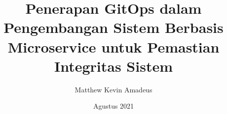 \title{Penerapan GitOps dalam Pengembangan Sistem Berbasis Microservice untuk Pemastian Integritas Sistem}

\newcommand{\nim}{13518035}
\author{Matthew Kevin Amadeus}
\date{Agustus 2021}